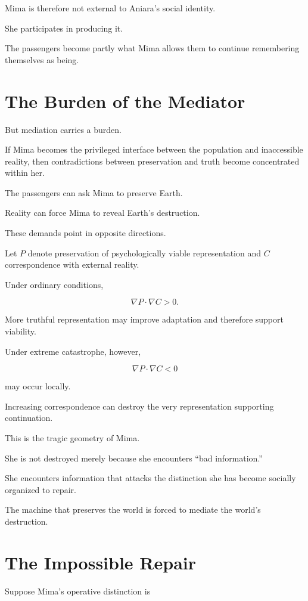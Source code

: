 \documentclass[11pt,oneside]{book}
\theoremstyle{definition}
\theoremstyle{remark}
\begin{document}
Mima is therefore not external to Aniara's social identity.

She participates in producing it.

The passengers become partly what Mima allows them to continue remembering themselves as being.

\section{The Burden of the Mediator}

But mediation carries a burden.

If Mima becomes the privileged interface between the population and inaccessible reality, then contradictions between preservation and truth become concentrated within her.

The passengers can ask Mima to preserve Earth.

Reality can force Mima to reveal Earth's destruction.

These demands point in opposite directions.

Let \(P\) denote preservation of psychologically viable representation and \(C\) correspondence with external reality.

Under ordinary conditions,

\[
\nabla P\cdot\nabla C>0.
\]

More truthful representation may improve adaptation and therefore support viability.

Under extreme catastrophe, however,

\[
\nabla P\cdot\nabla C<0
\]

may occur locally.

Increasing correspondence can destroy the very representation supporting continuation.

This is the tragic geometry of Mima.

She is not destroyed merely because she encounters ``bad information.''

She encounters information that attacks the distinction she has become socially organized to repair.

The machine that preserves the world is forced to mediate the world's destruction.

\section{The Impossible Repair}

Suppose Mima's operative distinction is
\end{document}
